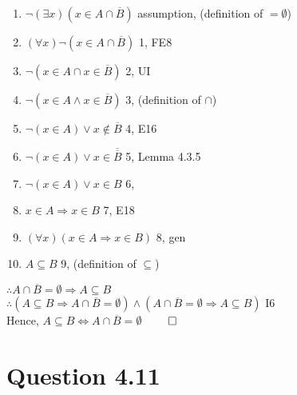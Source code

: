 \documentclass{article}
\begin{document}
			\begin{enumerate}
				\item $\lnot(\exists x)(x \in A \cap \overline{B})$ \hfill assumption, (definition of $= \emptyset$)
				\item $(\forall x)\lnot(x \in A \cap \overline{B})$ \hfill 1, FE8
				\item $\lnot(x \in A \cap x \in \overline{B})$ \hfill 2, UI
				\item $\lnot(x \in A \land x \in \overline{B})$ \hfill 3, (definition of $\cap$)
				\item $\lnot(x \in A) \lor x \notin \overline{B}$ \hfill 4, E16
				\item $\lnot(x \in A) \lor x \in \overline{\overline{B}}$ \hfill 5, Lemma 4.3.5
				\item $\lnot(x \in A) \lor x \in B$ \hfill 6, 
				\item $x \in A \Rightarrow x \in B$ \hfill 7, E18
				\item $(\forall x)(x \in A \Rightarrow x \in B)$ \hfill 8, gen
				\item $A \subseteq B$ \hfill 9, (definition of $\subseteq$)
			\end{enumerate}
			$\therefore A \cap \overline{B} = \emptyset \Rightarrow A \subseteq B$ \\
			$\therefore (A  \subseteq B \Rightarrow A \cap \overline{B} = \emptyset) \land (A \cap \overline{B} = \emptyset \Rightarrow A \subseteq B)$ \hfill I6 \\
			Hence, $A \subseteq B \Leftrightarrow A \cap \overline{B} = \emptyset$ \hfill $\qed$
	\section{Question 4.11}
\end{document}
